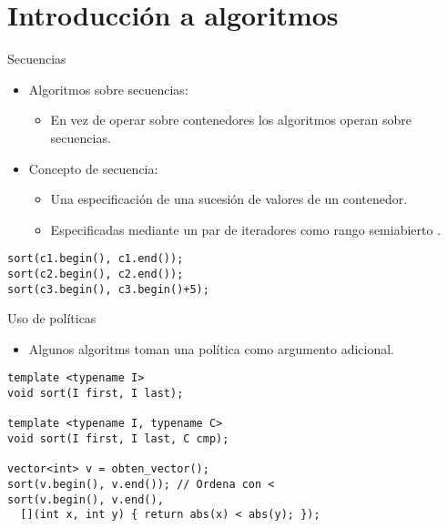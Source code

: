 \section{Introducción a algoritmos}

\begin{frame}[t,fragile]{Secuencias}
\begin{itemize}
  \item Algoritmos sobre secuencias:
    \begin{itemize}
      \item En vez de operar sobre contenedores los algoritmos operan sobre secuencias.
    \end{itemize}
  \item Concepto de secuencia:
    \begin{itemize}
      \item Una especificación de una sucesión de valores de un contenedor.
      \item Especificadas mediante un par de iteradores como rango semiabierto \cppid{[inicio,fin)}.
    \end{itemize}
\end{itemize}
\begin{lstlisting}
sort(c1.begin(), c1.end()); 
sort(c2.begin(), c2.end());
sort(c3.begin(), c3.begin()+5);
\end{lstlisting}
\end{frame}

\begin{frame}[t,fragile]{Uso de políticas}
\begin{itemize}
  \item Algunos algoritms toman una política como argumento adicional.
\end{itemize}
\begin{lstlisting}
template <typename I>
void sort(I first, I last);

template <typename I, typename C>
void sort(I first, I last, C cmp);

vector<int> v = obten_vector();
sort(v.begin(), v.end()); // Ordena con <
sort(v.begin(), v.end(), 
  [](int x, int y) { return abs(x) < abs(y); });
\end{lstlisting}
\end{frame}

